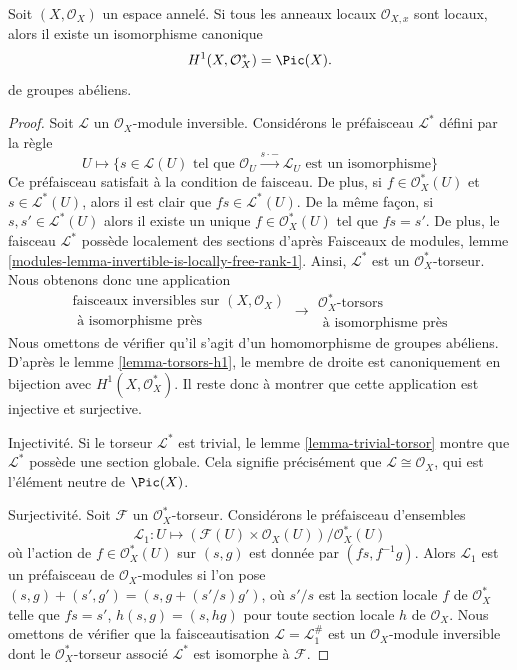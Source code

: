 \begin{lemma}

\label{lemma-h1-invertible}

Soit $(X, \mathcal{O}_X)$ un espace annelé. Si tous les anneaux locaux
$\mathcal{O}_{X, x}$ sont locaux, alors il existe un isomorphisme canonique
$$
H^1(X, \mathcal{O}_X^*) = \Pic(X).
$$
de groupes abéliens.

\end{lemma}

\begin{proof}

Soit $\mathcal{L}$ un $\mathcal{O}_X$-module inversible. Considérons le préfaisceau $\mathcal{L}^*$ défini par la règle
$$
U \longmapsto \{s \in \mathcal{L}(U)
\text{ tel que } \mathcal{O}_U \xrightarrow{s \cdot -} \mathcal{L}_U
\text{ est un isomorphisme}\}
$$
Ce préfaisceau satisfait à la condition de faisceau. De plus, si
$f \in \mathcal{O}_X^*(U)$ et $s \in \mathcal{L}^*(U)$, alors il est clair que
$fs \in \mathcal{L}^*(U)$. De la même façon, si $s, s' \in \mathcal{L}^*(U)$
alors il existe un unique $f \in \mathcal{O}_X^*(U)$ tel que
$fs = s'$. De plus, le faisceau $\mathcal{L}^*$ possède localement des sections d'après Faisceaux de modules, lemme \ref{modules-lemma-invertible-is-locally-free-rank-1}. Ainsi, $\mathcal{L}^*$ est un $\mathcal{O}_X^*$-torseur. Nous obtenons donc une application
$$
\begin{matrix}
\text{faisceaux inversibles sur }(X, \mathcal{O}_X) \\
\text{ à isomorphisme près}
\end{matrix}
\longrightarrow
\begin{matrix}
\mathcal{O}_X^*\text{-torsors} \\
\text{ à isomorphisme près}
\end{matrix}
$$
Nous omettons de vérifier qu'il s'agit d'un homomorphisme de groupes abéliens. D'après le lemme \ref{lemma-torsors-h1},
le membre de droite est canoniquement en bijection avec $H^1(X, \mathcal{O}_X^*)$. Il reste donc à montrer que cette application est injective et surjective.

\medskip\noindent
Injectivité. Si le torseur $\mathcal{L}^*$ est trivial, le lemme \ref{lemma-trivial-torsor} montre que $\mathcal{L}^*$ possède une section globale. Cela signifie précisément que $\mathcal{L} \cong \mathcal{O}_X$, qui est l'élément neutre de $\Pic(X)$.

\medskip\noindent

Surjectivité. Soit $\mathcal{F}$ un $\mathcal{O}_X^*$-torseur. Considérons le préfaisceau d'ensembles
$$
\mathcal{L}_1 : U \longmapsto
(\mathcal{F}(U) \times \mathcal{O}_X(U))/\mathcal{O}_X^*(U)
$$
où l'action de $f \in \mathcal{O}_X^*(U)$ sur
$(s, g)$ est donnée par $(fs, f^{-1}g)$. Alors $\mathcal{L}_1$ est un préfaisceau de $\mathcal{O}_X$-modules si l'on pose
$(s, g) + (s', g') = (s, g + (s'/s)g')$, où $s'/s$ est la section locale $f$ de $\mathcal{O}_X^*$ telle que $fs = s'$,
$h(s, g) = (s, hg)$ pour toute section locale $h$ de $\mathcal{O}_X$. Nous omettons de vérifier que la faisceautisation
$\mathcal{L} = \mathcal{L}_1^\#$ est un $\mathcal{O}_X$-module inversible dont le $\mathcal{O}_X^*$-torseur associé $\mathcal{L}^*$ est isomorphe à $\mathcal{F}$.


\end{proof}
